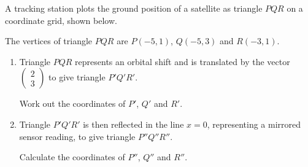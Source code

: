 \begin{question}
\noindent A tracking station plots the ground position of a satellite as triangle $PQR$ on a coordinate grid, shown below.

\begin{center}
\end{center}

\noindent The vertices of triangle $PQR$ are $P(-5,1)$, $Q(-5,3)$ and $R(-3,1)$.

\begin{enumerate}
    \item[(a)] Triangle $PQR$ represents an orbital shift and is translated by the vector $\begin{pmatrix} 2 \\ 3 \end{pmatrix}$ to give triangle $P'Q'R'$.

    Work out the coordinates of $P'$, $Q'$ and $R'$.

    \vspace{4cm}

    \item[(b)] Triangle $P'Q'R'$ is then reflected in the line $x = 0$, representing a mirrored sensor reading, to give triangle $P''Q''R''$.

    Calculate the coordinates of $P''$, $Q''$ and $R''$.

    \vspace{4cm}
\end{enumerate}
\end{question}
